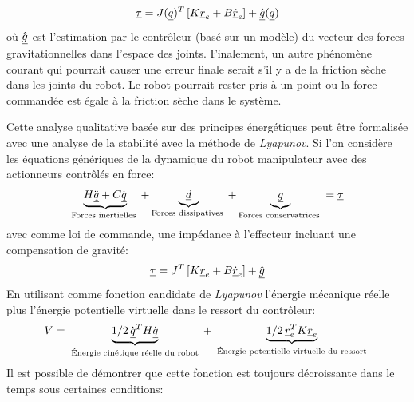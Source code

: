 \begin{align}
	\underline{\tau} = J(\underline{q})^T   \left[ K \underline{r}_e + B \underline{\dot{r}}_e \right] + \underline{\hat{g}}(\underline{q})
\end{align}
où $\underline{\hat{g}}$ est l'estimation par le contrôleur (basé sur un modèle) du vecteur des forces gravitationnelles dans l'espace des joints. Finalement, un autre phénomène courant qui pourrait causer une erreur finale serait s'il y a de la friction sèche dans les joints du robot. Le robot pourrait rester pris à un point ou la force commandée est égale à la friction sèche dans le système.

Cette analyse qualitative basée sur des principes énergétiques peut être formalisée avec une analyse de la stabilité avec la méthode de \textit{Lyapunov}. Si l'on considère les équations génériques de la dynamique du robot manipulateur avec des actionneurs contrôlés en force:
\begin{align}
	\underbrace{
		H \ddot{\underline{q}} + C \dot{\underline{q}}
	}_{\text{Forces inertielles }}
	+
	\underbrace{
		\underline{d}
	}_{\text{Forces dissipatives }}
	+
	\underbrace{
		\underline{g}
	}_{\text{Forces conservatrices }}
	= \underline{\tau}
\end{align}
avec comme loi de commande, une impédance à l'effecteur incluant une compensation de gravité:
\begin{align}
	\underline{\tau} = J^T   \left[ K \underline{r}_e + B \underline{\dot{r}}_e \right] + \underline{\hat{g}}
\end{align}
En utilisant comme fonction candidate de \textit{Lyapunov} l'énergie mécanique réelle plus l'énergie potentielle virtuelle dans le ressort du contrôleur:
\begin{align}
	V =
	\underbrace{
		1/2 \, \dot{\underline{q}}^T H \dot{\underline{q}}
	}_{\text{ Énergie cinétique réelle du robot }}
	+
	\underbrace{
		1/2 \, \underline{r}_e^T K \underline{r}_e
	}_{\text{ Énergie potentielle virtuelle du ressort }}
\end{align}
Il est possible de démontrer que cette fonction est toujours décroissante dans le temps sous certaines conditions:
